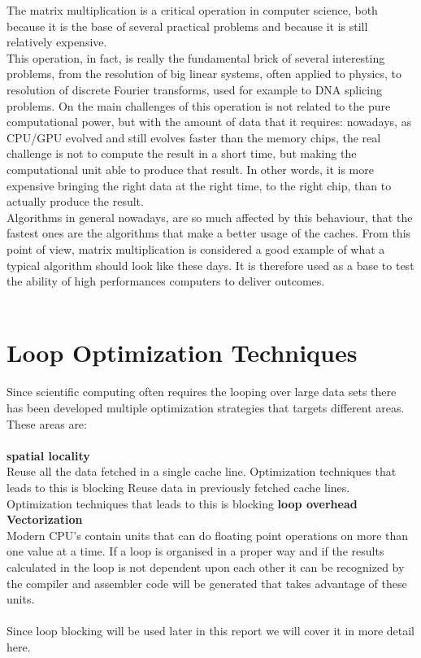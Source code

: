 The matrix multiplication is a critical operation in computer science, both because it is the base of several practical problems and because it is still relatively expensive. \\
This operation, in fact, is really the fundamental brick of several interesting problems, from the resolution of big linear systems, often applied to physics, to resolution of discrete Fourier transforms, used for example to DNA splicing problems.
On the main challenges of this operation is not related to the pure computational power, but with the amount of data that it requires: nowadays, as CPU/GPU evolved and still evolves faster than the memory chips, the real challenge is not to compute the result in a short time, but making the computational unit able to produce that result. In other words, it is more expensive bringing the right data at the right time, to the right chip, than to actually produce the result. \\
Algorithms in general nowadays, are so much affected by this behaviour, that the fastest ones are the algorithms that make a better usage of the caches.
From this point of view, matrix multiplication is considered a good example of what a typical algorithm should look like these days. It is therefore used as a base to test the ability of high performances computers to deliver outcomes. 
\\\\
\section{Loop Optimization Techniques}
Since scientific computing often requires the looping over large data sets there has been developed multiple optimization strategies that targets different areas. These areas are:
\\\\
\textbf{spatial locality}\\
Reuse all the data fetched in a single cache line. Optimization techniques that leads to this is blocking
Reuse data in previously fetched cache lines. Optimization techniques that leads to this is blocking
\textbf{loop overhead}\\ 

\textbf{Vectorization}\\
Modern CPU's contain units that can do floating point operations on more than one value at a time. If a loop is organised in a proper way and if the results calculated in the loop is not dependent upon each other it can be recognized by the compiler and assembler code will be generated that takes advantage of these units.
\\\\
Since loop blocking will be used later in this report we will cover it in more detail here.
